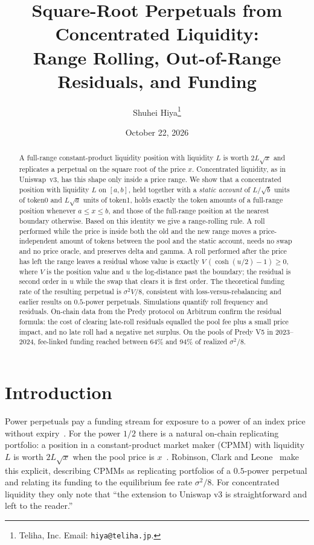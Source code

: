 \documentclass[11pt]{article}
\title{Square-Root Perpetuals from Concentrated Liquidity:\\
Range Rolling, Out-of-Range Residuals, and Funding}
\author{Shuhei Hiya\thanks{Teliha, Inc. Email: \texttt{hiya@teliha.jp}.}}
\date{October 22, 2026}
\theoremstyle{definition}
\theoremstyle{remark}
\begin{document}
\maketitle

\begin{abstract}
A full-range constant-product liquidity position with liquidity $L$ is worth $2L\sqrt{x}$ and replicates a perpetual on the square root of the price $x$. Concentrated liquidity, as in Uniswap~v3, has this shape only inside a price range. We show that a concentrated position with liquidity $L$ on $[a,b]$, held together with a \emph{static account} of $L/\sqrt{b}$ units of token0 and $L\sqrt{a}$ units of token1, holds exactly the token amounts of a full-range position whenever $a\le x\le b$, and those of the full-range position at the nearest boundary otherwise. Based on this identity we give a range-rolling rule. A roll performed while the price is inside both the old and the new range moves a price-independent amount of tokens between the pool and the static account, needs no swap and no price oracle, and preserves delta and gamma. A roll performed after the price has left the range leaves a residual whose value is exactly $V\,(\cosh(u/2)-1)\ge 0$, where $V$ is the position value and $u$ the log-distance past the boundary; the residual is second order in $u$ while the swap that clears it is first order. The theoretical funding rate of the resulting perpetual is $\sigma^2 V/8$, consistent with loss-versus-rebalancing and earlier results on $0.5$-power perpetuals. Simulations quantify roll frequency and residuals. On-chain data from the Predy protocol on Arbitrum confirm the residual formula: the cost of clearing late-roll residuals equalled the pool fee plus a small price impact, and no late roll had a negative net surplus. On the pools of Predy V5 in 2023--2024, fee-linked funding reached between 64\% and 94\% of realized $\sigma^2/8$.
\end{abstract}

\section{Introduction}

Power perpetuals pay a funding stream for exposure to a power of an index price without expiry~\cite{white2021power}. For the power $1/2$ there is a natural on-chain replicating portfolio: a position in a constant-product market maker (CPMM) with liquidity $L$ is worth $2L\sqrt{x}$ when the pool price is $x$~\cite{clark2020replicating}. Robinson, Clark and Leone~\cite{robinson2024perp} make this explicit, describing CPMMs as replicating portfolios of a $0.5$-power perpetual and relating its funding to the equilibrium fee rate $\sigma^2/8$. For concentrated liquidity they only note that ``the extension to Uniswap v3 is straightforward and left to the reader.''
\end{document}
